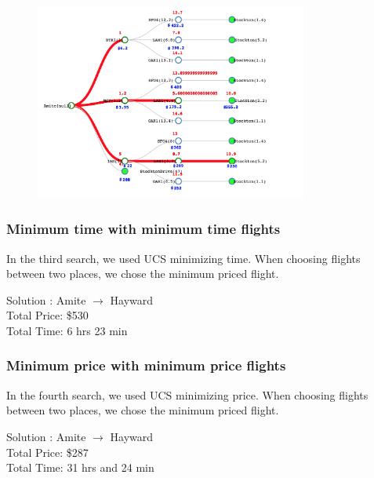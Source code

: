 \documentclass[11pt]{article}
\begin{document}
\begin{figure}[!ht]
  \centering
  \includegraphics[width=0.8\textwidth]{time_lim}
  \label{fig:time_lim}
\end{figure}

\pagebreak

\subsubsection{Minimum time with minimum time flights}

In the third search, we used UCS minimizing time. When choosing flights between two places, we chose the minimum priced flight.

\begin{center}
Solution : Amite  $\rightarrow$ Hayward \\
\quad Total Price: \$530 \\
\quad Total Time: 6 hrs 23 min\\
\end{center}

\subsubsection{Minimum price with minimum price flights}

In the fourth search, we used UCS minimizing price. When choosing flights between two places, we chose the minimum priced flight.

\begin{center}
Solution : Amite $\rightarrow$ Hayward \\
\quad Total Price: \$287 \\
\quad Total Time: 31 hrs and 24 min\\
\end{center}
\end{document}
